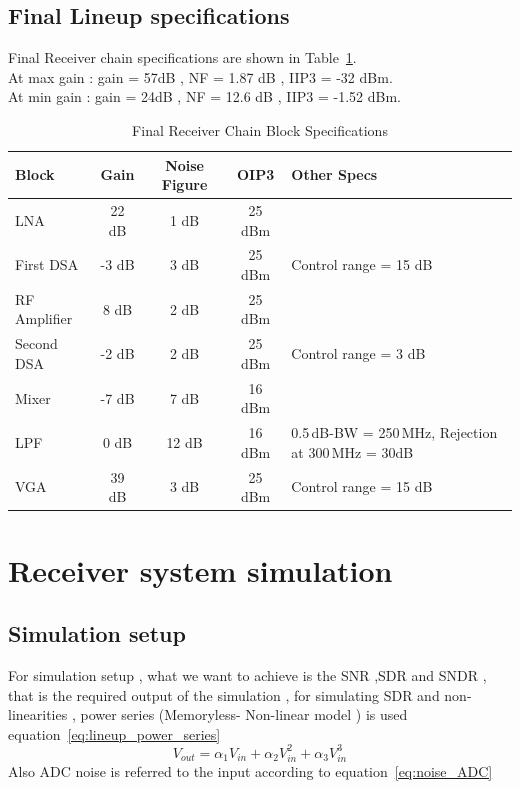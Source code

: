 \subsection{Final Lineup specifications}%
Final Receiver chain specifications are shown in 
Table~\ref{tab:final_specs}.\\
At max gain : gain = 57dB , NF = 1.87 dB , IIP3 = -32 dBm.\\
At min gain : gain = 24dB , NF = 12.6 dB , IIP3 = -1.52 dBm.
\begin{table}[htbp]
    \centering
    \label{tab:final_specs}
    \caption{Final Receiver Chain Block Specifications}
    \begin{tabularx}{\textwidth}{l c c c X} 
        \toprule
        \textbf{Block} & \textbf{Gain} & \textbf{Noise Figure} & \textbf{OIP3} & \textbf{Other Specs} \\ 
        \midrule
         LNA   & 22 dB & 1 dB & 25 dBm & \\ 
    First DSA & -3 dB & 3 dB & 25 dBm & Control range = 15 dB \\ 
        RF Amplifier & 8 dB & 2 dB & 25 dBm &  \\ 
    Second DSA & -2 dB & 2 dB & 25 dBm & Control range = 3 dB \\ 
        Mixer  & -7 dB & 7 dB & 16 dBm & \\ 
        LPF   & 0 dB & 12 dB & 16 dBm & 0.5\,dB-BW = 250\,MHz, \newline Rejection at 300\,MHz = 30dB  \\ 
        VGA & 39 dB & 3 dB & 25 dBm & Control range = 15 dB\\
        \bottomrule
    \end{tabularx}
\end{table}
\section{Receiver system simulation}%
\label{sec:Receiver system simulation}
\subsection{Simulation setup}%
For simulation setup , what we want to achieve is the SNR ,SDR and
SNDR , that is the required output of the simulation , 
for simulating SDR and non-linearities , power series (Memoryless-
Non-linear model ) is used equation~\ref{eq:lineup_power_series}
\begin{equation}
    V_{out} = \alpha_1 V_{in} + \alpha_2 V_{in}^2 + \alpha_3 
    V_{in}^3
    \label{eq:lineup_power_series}
\end{equation}
Also ADC noise is referred to the input according to equation~\ref{eq:noise_ADC}

